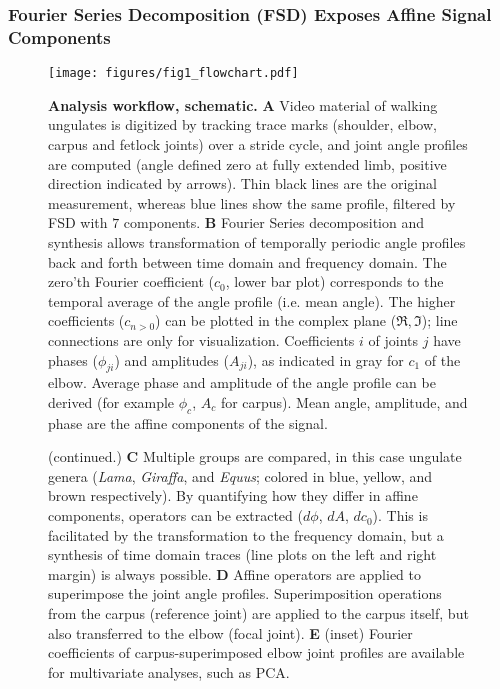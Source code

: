 \documentclass[10pt, a4paper]{article}
\begin{document}
\begin{linenumbers}[1]
\subsubsection*{Fourier Series Decomposition (FSD) Exposes Affine Signal Components}

\begin{figure}[b!]
\begin{center}
\texttt{[image: figures/fig1\_flowchart.pdf]}
\end{center}
\caption[Workflow]{\textbf{Analysis workflow, schematic.} 
\textbf{A} Video material of walking ungulates is digitized by tracking trace marks (shoulder, elbow, carpus and fetlock joints) over a stride cycle, and joint angle profiles are computed (angle defined zero at fully extended limb, positive direction indicated by arrows). Thin black lines are the original measurement, whereas blue lines show the same profile, filtered by FSD with $7$ components. 
\textbf{B} Fourier Series decomposition and synthesis allows transformation of temporally periodic angle profiles back and forth between time domain and frequency domain. The zero'th Fourier coefficient ($c_{0}$, lower bar plot) corresponds to the temporal average of the angle profile (i.e. mean angle). The higher coefficients ($c_{n>0}$) can be plotted in the complex plane ($\Re, \Im$); line connections are only for visualization. Coefficients $i$ of joints $j$ have phases ($\phi_{ji}$) and amplitudes ($A_{ji}$), as indicated in gray for $c_{1}$ of the elbow. Average phase and amplitude of the angle profile can be derived (for example $\phi_{c}$, $A_{c}$ for carpus). Mean angle, amplitude, and phase are the affine components of the signal. 
 }
\label{fig:workflow}
\end{figure}
\addtocounter{figure}{-1}
\begin{figure}[t!]
  \caption{(continued.) 
 \textbf{C} Multiple groups are compared, in this case ungulate genera (\textit{Lama}, \textit{Giraffa}, and \textit{Equus}; colored in blue, yellow, and brown respectively). By quantifying how they differ in affine components, operators can be extracted ($d\phi$, $dA$, $dc_{0}$). This is facilitated by the transformation to the frequency domain, but a synthesis of time domain traces (line plots on the left and right margin) is always possible. 
 \textbf{D} Affine operators are applied to superimpose the joint angle profiles. Superimposition operations from the carpus (reference joint) are applied to the carpus itself, but also transferred to the elbow (focal joint). 
\textbf{E} (inset) Fourier coefficients of carpus-superimposed elbow joint profiles are available for multivariate analyses, such as PCA.  
  }
\end{figure}


\end{linenumbers}
\end{document}
